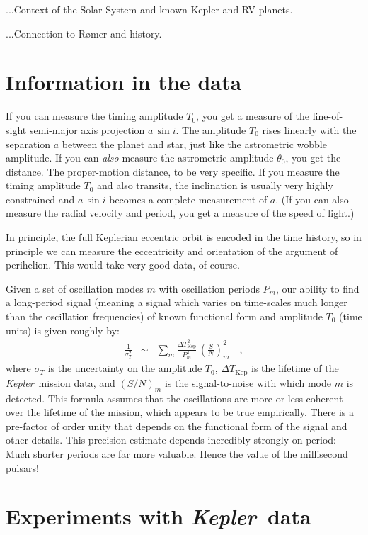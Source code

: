 \documentclass[12pt, preprint]{aastex}
\newcommand{\project}[1]{\textsl{#1}}
\newcommand{\Kepler}{\project{Kepler}}
\newcommand{\DeltaTKepler}{\Delta T_{\mathrm{Kep}}}
\begin{document}
...Context of the Solar System and known Kepler and RV planets.

...Connection to R\o mer and history.

\section{Information in the data}

If you can measure the timing amplitude $T_0$, you get a measure of
the line-of-sight semi-major axis projection $a\,\sin i$.
The amplitude $T_0$ rises linearly with the separation $a$ between the
planet and star, just like the astrometric wobble amplitude.
If you can \emph{also} measure the astrometric amplitude $\theta_0$,
you get the distance.
The proper-motion distance, to be very specific.
If you measure the timing amplitude $T_0$ and also transits, the
inclination is usually very highly constrained and $a\,\sin i$ becomes
a complete measurement of $a$.
(If you can also measure the radial velocity and period, you get a
measure of the speed of light.)

In principle, the full Keplerian eccentric orbit is encoded in the
time history, so in principle we can measure the eccentricity and
orientation of the argument of perihelion.
This would take very good data, of course.

Given a set of oscillation modes $m$ with oscillation periods $P_m$,
our ability to find a long-period signal (meaning a signal which
varies on time-scales much longer than the oscillation frequencies) of
known functional form and amplitude $T_0$ (time units) is given
roughly by:
\begin{eqnarray}
\frac{1}{\sigma_T^2} &\sim& \sum_m \frac{\DeltaTKepler^2}{P_m^4}\,\left(\frac{S}{N}\right)_m^2
\quad ,
\end{eqnarray}
where $\sigma_T$ is the uncertainty on the amplitude $T_0$,
$\DeltaTKepler$ is the lifetime of the \Kepler\ mission data, and
$(S/N)_m$ is the signal-to-noise with which mode $m$ is detected.
This formula assumes that the oscillations are more-or-less coherent
over the lifetime of the mission, which appears to be true
empirically.
There is a pre-factor of order unity that depends on the functional
form of the signal and other details.
This precision estimate depends incredibly strongly on period:
Much shorter periods are far more valuable.
Hence the value of the millisecond pulsars!

\section{Experiments with \Kepler\ data}
\end{document}
